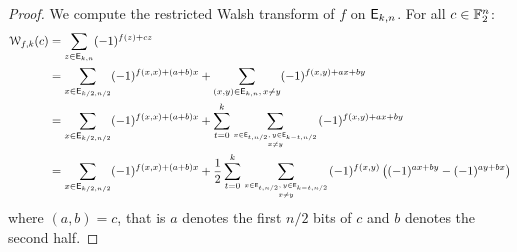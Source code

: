 \documentclass[11pt]{llncs}
\begin{document}
\begin{proof}
	
We compute the restricted Walsh transform of $f$ on $\mathsf{E}_{k,n}$. For all $c\in \mathbb{F}_2^n$:
\begin{align*}
\mathcal{W}_{f,k}(c)&=\sum_{z\in \mathsf{E}_{k,n}} (-1)^{f(z)+c z}\\
&=\sum_{x\in \mathsf{E}_{k/2,n/2}} (-1)^{f(x,x)+(a+b)x} + \sum_{(x,y)\in \mathsf{E}_{k,n},\, x \ne y} (-1)^{f(x,y)+ax+by}\\
&=\sum_{x\in \mathsf{E}_{k/2,n/2}} (-1)^{f(x,x)+(a+b)x} + 
\sum_{t=0}^{k} \sum_{x\in \mathsf{E}_{t,n/2}, \,y\in \mathsf{E}_{k-t,n/2}\atop {x \ne y} } (-1)^{f(x,y)+ax+by}\\
&=\sum_{x\in \mathsf{E}_{k/2,n/2}} (-1)^{f(x,x)+(a+b)x} + \frac{1}{2}
\sum_{t=0}^{k} \sum_{x\in \mathsf{E}_{t,n/2}, \,y\in \mathsf{E}_{k-t,n/2}\atop {x \ne y} }  (-1)^{f(x,y)} \left( (-1)^{a x+ by} - (-1)^{a y+ bx} \right)
\end{align*}
where $(a,b)=c$, that is $a$ denotes the first $n/2$ bits of $c$ and $b$ denotes the second half.


\end{proof}
\end{document}
